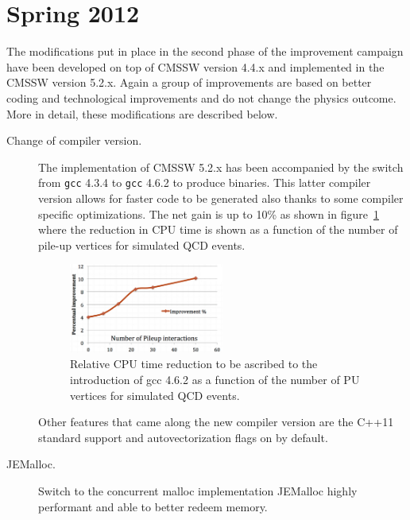 \section{Spring 2012}
\label{spring12}

The modifications put in place in the second phase of the
improvement campaign have been developed on top of CMSSW version 4.4.x
and implemented in the CMSSW version 5.2.x. Again a group of
improvements are based on better coding and technological
improvements and do not change the physics outcome. More in detail,
these modifications are described below.

\begin{description}
\item[Change of compiler version.] The implementation of CMSSW
  5.2.x has been accompanied by the switch from \verb-gcc- 4.3.4
  to \verb-gcc- 4.6.2 to produce binaries. This latter compiler
  version allows for faster code to be generated also thanks to some
  compiler specific optimizations. The net gain is up
  to 10\% as shown in figure~\ref{fig:gcc} where the reduction in CPU
  time is shown as a function of the number of pile-up vertices for
  simulated QCD events.
\begin{figure}[b]
\includegraphics*[width=0.5\textwidth]{figs/gcc.png}\hspace{0.02\textwidth}%
\begin{minipage}[b]{0.38\textwidth}\caption{\label{fig:gcc}Relative
    CPU time reduction to be ascribed to the introduction of
    gcc 4.6.2 as a function of the number of PU vertices for
    simulated QCD events.} 
\end{minipage}
\end{figure}
  Other features that came along the new compiler version are the
  C++11 standard support and autovectorization flags on by default.
\item[JEMalloc.] Switch to the concurrent malloc implementation
  JEMalloc highly performant and able to better redeem memory.

\end{description}
